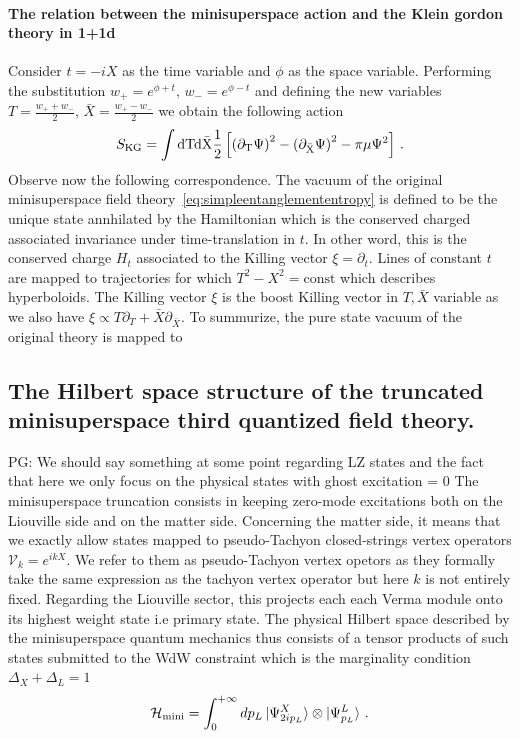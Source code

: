 \documentclass[a4paper]{article}
\newcommand{\purple}[1]{{\color{purple} #1 \color{black}}}
\newcommand{\PG}[1]{{\purple{PG: #1}}} %
\begin{document}
\paragraph{The relation between the minisuperspace action and the Klein gordon theory in 1+1d}
Consider $t=-iX$ as the time variable and $\phi$ as the space variable. Performing the substitution $w_+=e^{\phi + t}, \, w_-=e^{\phi-t}$ and defining the new variables $T = \frac{w_+ +w_-}{2},\,\bar{X} = \frac{w_+ - w_-}{2}$ we obtain the following action
\begin{equation}
\begin{aligned}
    S_{\rm{KG}} = \int \rm{d}T \rm{d}\bar{X} \frac{1}{2}\left[\left(\partial_T \Psi\right)^2 -\left(\partial_{\bar{X}} \Psi\right)^2 - \pi \mu \Psi^2\right]\,.
\end{aligned}
\end{equation}
Observe now the following correspondence. The vacuum of the original minisuperspace field theory~\eqref{eq:simpleentanglemententropy} is defined to be the unique state annhilated by the Hamiltonian which is the conserved charged associated invariance under time-translation in $t$. In other word, this is the conserved charge $H_t$ associated to the Killing vector $\xi=\partial_t$. Lines of constant $t$ are mapped to trajectories for which $T^2-X^2=\text{const}$ which describes hyperboloids. The Killing vector $\xi$ is the boost Killing vector in $T,\bar{X}$ variable as we also have $\xi \propto T\partial_T + \bar{X}\partial_{\bar{X}}$. To summurize, the pure state vacuum of the original theory is mapped to
\subsection{The Hilbert space structure of the truncated minisuperspace third quantized field theory.}
\PG{We should say something at some point regarding LZ states and the fact that here we only focus on the physical states with ghost excitation = 0}
The minisuperspace truncation consists in keeping zero-mode excitations both on the Liouville side and on the matter side. Concerning the matter side, it means that we exactly allow states mapped to pseudo-Tachyon closed-strings vertex operators $\mathcal{V}_k = e^{i k X}$. We refer to them as pseudo-Tachyon vertex opetors as they formally take the same expression as the tachyon vertex operator but here $k$ is not entirely fixed. Regarding the Liouville sector, this projects each each Verma module onto its highest weight state i.e primary state. The physical Hilbert space described by the minisuperspace quantum mechanics thus consists of a tensor products of such states submitted to the WdW constraint which is the marginality condition $\Delta_X + \Delta_L =1$
\begin{equation}
  \mathcal{H}_{\text{mini}} = \int_{0}^{+\infty} dp_L \ket{\Psi^{X}_{2i p_L}} \otimes \ket{\Psi^{L}_{p_L}}\,.
\end{equation}
\end{document}

